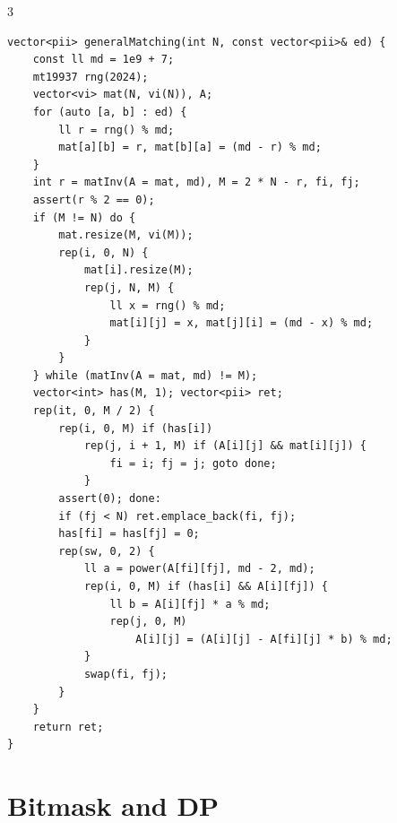 \documentclass[9pt,a4paper]{extarticle}
\begin{document}
\begin{multicols*}{3}
\begin{lstlisting}
vector<pii> generalMatching(int N, const vector<pii>& ed) {
    const ll md = 1e9 + 7;
    mt19937 rng(2024);
    vector<vi> mat(N, vi(N)), A;
    for (auto [a, b] : ed) {
        ll r = rng() % md;
        mat[a][b] = r, mat[b][a] = (md - r) % md;
    }
    int r = matInv(A = mat, md), M = 2 * N - r, fi, fj;
    assert(r % 2 == 0);
    if (M != N) do {
        mat.resize(M, vi(M));
        rep(i, 0, N) {
            mat[i].resize(M);
            rep(j, N, M) {
                ll x = rng() % md;
                mat[i][j] = x, mat[j][i] = (md - x) % md;
            }
        }
    } while (matInv(A = mat, md) != M);
    vector<int> has(M, 1); vector<pii> ret;
    rep(it, 0, M / 2) {
        rep(i, 0, M) if (has[i])
            rep(j, i + 1, M) if (A[i][j] && mat[i][j]) {
                fi = i; fj = j; goto done;
            }
        assert(0); done:
        if (fj < N) ret.emplace_back(fi, fj);
        has[fi] = has[fj] = 0;
        rep(sw, 0, 2) {
            ll a = power(A[fi][fj], md - 2, md);
            rep(i, 0, M) if (has[i] && A[i][fj]) {
                ll b = A[i][fj] * a % md;
                rep(j, 0, M)
                    A[i][j] = (A[i][j] - A[fi][j] * b) % md;
            }
            swap(fi, fj);
        }
    }
    return ret;
}
\end{lstlisting}

\section{Bitmask and DP}


\end{multicols*}
\end{document}
